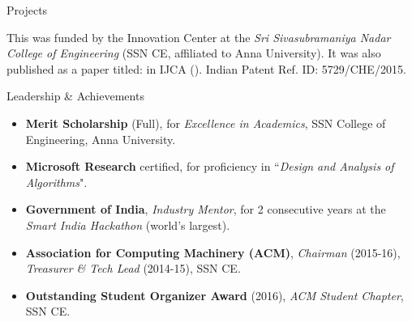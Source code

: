\documentclass[]{mcdowellcv}
\begin{document}
\begin{cvsection}{Projects}
\begin{cvsubsection}{}{}{}
\begin{itemize}
				This \href{https://github.com/tpsatish95/home-automation-system}{\color{blue!70}{research project}} was funded by the Innovation Center at the \textit{Sri Sivasubramaniya Nadar College of Engineering} (SSN CE, affiliated to Anna University). It was also published as a paper titled: \href{http://research.ijcaonline.org/volume116/number11/pxc3902601.pdf}{} in IJCA (\href{https://scholar.google.co.in/citations?user=gNr8v84AAAAJ&hl=en&oi=ao}{\color{blue!70}{cited 45 times}}). Indian Patent Ref. ID: 5729/CHE/2015.
			\end{itemize}
		\end{cvsubsection}
	\end{cvsection}

	\begin{cvsection}{Leadership \& Achievements}
		\begin{cvsubsection}{}{}{}
			\begin{itemize}
				\item \textbf{Merit Scholarship} (Full), for \textit{Excellence in Academics}, SSN College of Engineering, Anna University.
                \item \textbf{Microsoft Research} certified, for proficiency in ``\textit{Design and Analysis of Algorithms}".
                \item\textbf{Government of India}, \textit{Industry Mentor}, for 2 consecutive years at the \textit{Smart India Hackathon} (world's largest).
                \item \textbf{Association for Computing Machinery (ACM)}, \textit{Chairman} (2015-16), \textit{Treasurer \& Tech Lead} (2014-15), SSN CE.
                \item \textbf{Outstanding Student Organizer Award} (2016), \textit{ACM Student Chapter}, SSN CE.
			\end{itemize}
		\end{cvsubsection}
	\end{cvsection}
\end{document}
